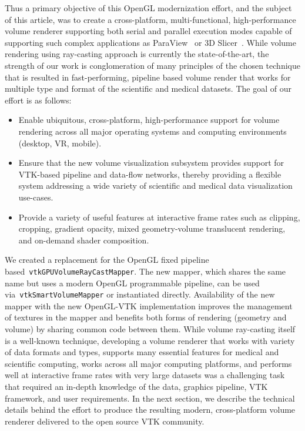 Thus a primary objective of this OpenGL modernization effort, and the
subject of this article, was to create a cross-platform, multi-functional,
high-performance volume renderer supporting both serial and parallel execution
modes capable of supporting such complex applications as
ParaView~\citep{ahrens_paraview:_2005,ayachit_paraview_2015} or 3D
Slicer~\citep{fedorov_3d_2012}.  While volume rendering using ray-casting
approach is currently the state-of-the-art, the strength of our work is
conglomeration of many principles of the chosen technique that is resulted in
fast-performing, pipeline based volume render that works for multiple type and
format of the scientific and medical datasets. The goal of our effort is as follows:

\begin{itemize}
  \item Enable ubiquitous, cross-platform, high-performance support for volume
    rendering across all major operating systems and computing environments
    (desktop, VR, mobile).

  \item Ensure that the new volume visualization subsystem provides support for
    VTK-based pipeline and data-flow networks, thereby providing a flexible
    system addressing a wide variety of scientific and medical data
    visualization use-cases.

  \item Provide a variety of useful features at interactive frame rates such as
    clipping, cropping, gradient opacity, mixed geometry-volume translucent
    rendering, and on-demand shader composition.
\end{itemize}

We created a replacement for the OpenGL fixed pipeline
based~\texttt{vtkGPUVolumeRayCastMapper}. The new mapper, which shares the same
name but uses a modern OpenGL programmable pipeline, can be used
via~\texttt{vtkSmartVolumeMapper} or instantiated directly. Availability of the
new mapper with the new OpenGL-VTK implementation improves the management of
textures in the mapper and benefits both forms of rendering (geometry and
volume) by sharing common code between them. While volume ray-casting itself is
a well-known technique, developing a volume renderer that works with variety of
data formats and types, supports many essential features for medical and
scientific computing, works across all major computing platforms, and performs
well at interactive frame rates with very large datasets was a challenging task
that required an in-depth knowledge of the data, graphics pipeline, VTK
framework, and user requirements.  In the next section, we describe the
technical details behind the effort to produce the resulting modern,
cross-platform volume renderer delivered to the open source VTK community.
